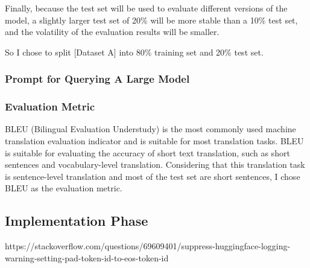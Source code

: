 Finally, because the test set will be used to evaluate different versions of the model, 
a slightly larger test set of 20\% will be more stable than a 10\% test set, 
and the volatility of the evaluation results will be smaller.

So I chose to split [Dataset A] into 80\% training set and 20\% test set.

\subsubsection{Prompt for Querying A Large Model}

\subsubsection{Evaluation Metric}
BLEU (Bilingual Evaluation Understudy)\cite{10.3115/1073083.1073135} is the most commonly used 
machine translation evaluation indicator and is suitable for most translation tasks. 
BLEU is suitable for evaluating the accuracy of short text translation, 
such as short sentences and vocabulary-level translation. 
Considering that this translation task is sentence-level translation and 
most of the test set are short sentences, I chose BLEU as the evaluation metric.

\subsection{Implementation Phase}
\label{subsec:implementation}

https://stackoverflow.com/questions/69609401/suppress-huggingface-logging-warning-setting-pad-token-id-to-eos-token-id
